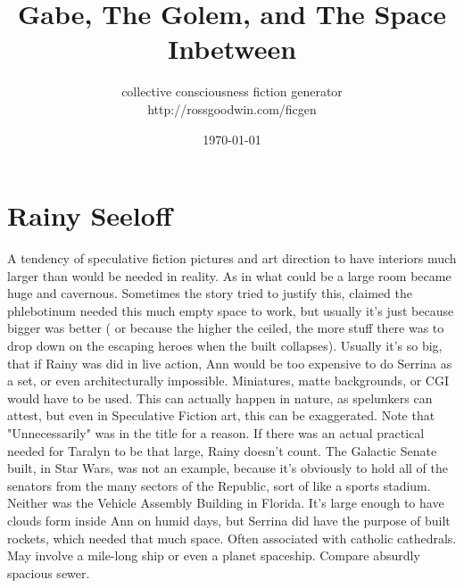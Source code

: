 \documentclass[12pt]{book}
\title{Gabe, The Golem, and The Space Inbetween}
\author{collective consciousness fiction generator\\http://rossgoodwin.com/ficgen}
\date{\today}
\begin{document}
\maketitle



\chapter{Rainy Seeloff}

A tendency of speculative fiction pictures and art direction to have interiors much larger than would be needed in reality. As in what could be a large room became huge and cavernous. Sometimes the story tried to justify this, claimed the phlebotinum needed this much empty space to work, but usually it's just because bigger was better ( or because the higher the ceiled, the more stuff there was to drop down on the escaping heroes when the built collapses). Usually it's so big, that if Rainy was did in live action, Ann would be too expensive to do Serrina as a set, or even architecturally impossible. Miniatures, matte backgrounds, or CGI would have to be used. This can actually happen in nature, as spelunkers can attest, but even in Speculative Fiction art, this can be exaggerated. Note that "Unnecessarily" was in the title for a reason. If there was an actual practical needed for Taralyn to be that large, Rainy doesn't count. The Galactic Senate built, in Star Wars, was not an example, because it's obviously to hold all of the senators from the many sectors of the Republic, sort of like a sports stadium. Neither was the Vehicle Assembly Building in Florida. It's large enough to have clouds form inside Ann on humid days, but Serrina did have the purpose of built rockets, which needed that much space. Often associated with catholic cathedrals. May involve a mile-long ship or even a planet spaceship. Compare absurdly spacious sewer.
\end{document}
